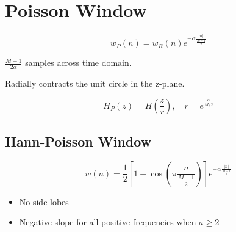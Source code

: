 \documentclass[11pt]{article}
\begin{document}
\section*{Poisson Window} \indent

\[w_P(n) = w_R(n) e^{-\alpha \frac{|n|}{\frac{M-1}{2}}}\]

$\frac{M-1}{2\alpha}$ samples across time domain.

Radially contracts the unit circle in the z-plane.

\[H_P(z) = H(\frac{z}{r}),\quad r = e^{\frac{\alpha}{M/2}}\]

\subsection*{Hann-Poisson Window} \indent

\[w(n) = \frac{1}{2} [1 + \cos(\pi \frac{n}{\frac{M-1}{2}})] e^{-\alpha \frac{|n|}{\frac{M-1}{2}}}\]

\begin{itemize}
\item No side lobes
\item Negative slope for all positive frequencies when $a \geq 2$
\end{itemize}
\end{document}
